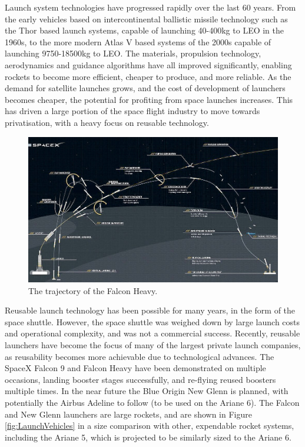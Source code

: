     Launch system technologies have progressed rapidly over the last 60 years. From the early vehicles based on intercontinental ballistic missile technology such as the Thor based launch systems, capable of launching 40-400kg to LEO in the 1960s, to the more modern Atlas V based systems of the 2000s capable of launching 9750-18500kg to LEO\cite{Kendall2010}. 
    The materials, propulsion technology, aerodynamics and guidance algorithms have all improved significantly, enabling  rockets to become more efficient, cheaper to produce, and more reliable. As the demand for satellite launches grows, and the cost of development of launchers becomes cheaper, the potential for profiting from space launches increases. 
    This has driven a large portion of the space flight industry to move towards privatisation, with a heavy focus on reusable technology. 
    \begin{figure}[ht]
    	\centering
    	\includegraphics[width=1\linewidth]{"figures/2_literature-review/FalconTrajectory"}
    	\caption{The trajectory of the Falcon Heavy\cite{FalconHeavy}.}
    	\label{fig:FalconTrajectory}
    \end{figure}
    
    Reusable launch technology has been possible for many years, in the form of the space shuttle. However, the space shuttle was weighed down by large launch costs and operational complexity, and was not a commercial success\cite{Launius2006}. Recently, reusable launchers have become the focus of many of the largest private launch companies, as reusability becomes more achievable due to technological advances\cite{Foust2018,Mosher2018}. The SpaceX Falcon 9 and Falcon Heavy have been demonstrated on multiple occasions, landing booster stages successfully, and re-flying reused boosters multiple times\cite{Foust2018}. In the near future the Blue Origin New Glenn is planned\cite{Foust2018}, with potentially the Airbus Adeline to follow (to be used on the Ariane 6)\cite{Adeline}. The Falcon and New Glenn launchers are large rockets, and are shown in Figure \ref{fig:LaunchVehicles} in a size comparison with other, expendable rocket systems, including the Ariane 5, which is projected to be similarly sized to the Ariane 6. 
     
